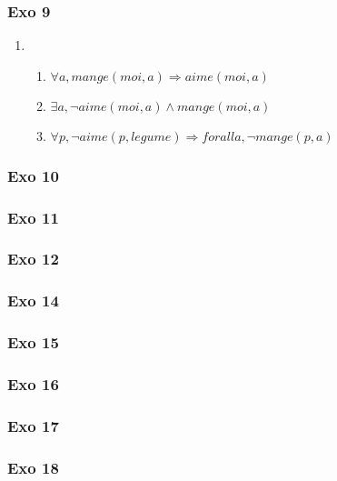 \documentclass[]{book}
\theoremstyle{definition}
\begin{document}
\subsubsection*{Exo 9}
\begin{enumerate}
\item
\begin{enumerate}
\item $\forall a, mange(moi,a) \Rightarrow aime(moi,a)$
\item $\exists a, \lnot aime(moi, a) \land mange(moi, a)$
\item $\forall p, \lnot aime(p, legume) \Rightarrow forall a, \lnot mange(p, a)$
\end{enumerate} 
\end{enumerate}

\subsubsection*{Exo 10}

\subsubsection*{Exo 11}

\subsubsection*{Exo 12}

\subsubsection*{Exo 14}

\subsubsection*{Exo 15}

\subsubsection*{Exo 16}

\subsubsection*{Exo 17}

\subsubsection*{Exo 18}
\end{document}
